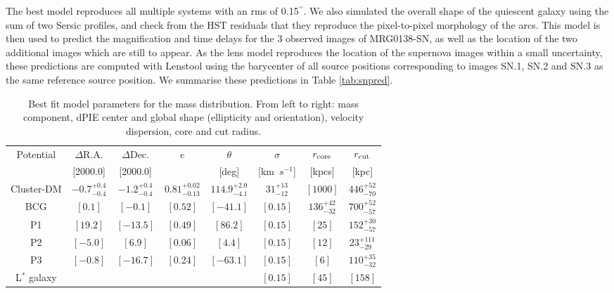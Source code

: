 \documentclass[12pt,dvipsnames]{article}
\gdef\arcsec{$^{\prime\prime}$}
\begin{document}
The best model reproduces all multiple systems with an rms of 0.15\arcsec. We also simulated the overall shape of the quiescent galaxy using the sum of two Sersic profiles, and check from the HST residuals that they reproduce the pixel-to-pixel morphology of the arcs. This model is then used to predict the magnification and time delays for the 3 observed images of MRG0138-SN, as well as the location of the two additional images which are still to appear. As the lens model reproduces the location of the supernova images within a small uncertainty, these predictions are computed with Lenstool using the barycenter of all source positions corresponding to images SN.1, SN.2 and SN.3 as the same reference source position. We summarise these predictions in Table \ref{tab:snpred}.

\begin{table}[]
    \centering
    \begin{tabular}{c|c|c|c|c|c|c|c|}
    Potential & $\Delta$R.A. & $\Delta$Dec. & $e$ & $\theta$ & $\sigma$ & $r_{\rm core}$ & $r_{\rm cut}$ \\
    & [2000.0] & [2000.0] & & [deg] & [km\ $s^{-1}$] & [kpcs] & [kpc] \\
\hline
Cluster-DM & $ -0.7^{+  0.4}_{ -0.4}$ & $ -1.2^{+  0.4}_{ -0.4}$ & $ 0.81^{+ 0.02}_{-0.13}$ & $114.9^{+  2.0}_{ -4.1}$ & $31^{+13}_{-12}$ & $[1000]$ & $446^{+52}_{-70}$ \\
BCG & $[  0.1]$ & $[ -0.1]$ & $[0.52]$ & $[-41.1]$ & $[0.15]$ & $136^{+42}_{-32}$ & $700^{+52}_{-57}$ \\
P1 & $[ 19.2]$ & $[-13.5]$ & $[0.49]$ & $[ 86.2]$ & $[0.15]$ & $[25]$ & $152^{+30}_{-57}$ \\
P2 & $[ -5.0]$ & $[  6.9]$ & $[0.06]$ & $[  4.4]$ & $[0.15]$ & $[12]$ & $23^{+111}_{-29}$ \\
P3 & $[ -0.8]$ & $[-16.7]$ & $[0.24]$ & $[-63.1]$ & $[0.15]$ & $[6]$ & $110^{+35}_{-32}$ \\
L$^{*}$ galaxy &  & & & & $[0.15]$ & $[45]$ & $[158]$\\
\hline
    \end{tabular}
    \caption{Best fit model parameters for the mass distribution. From left to right: mass component, dPIE center and global shape (ellipticity and orientation), velocity dispersion, core and cut radius.}
    \label{tab:massmodel}
\end{table}
\end{document}

